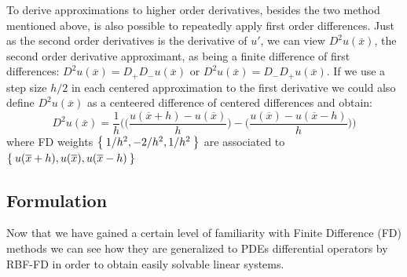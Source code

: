 To derive approximations to higher order derivatives, besides the two method mentioned above, is also possible to repeatedly apply first order differences. Just as the second order derivatives is the derivative of $u'$, we can view $D^2u(\overline{x})$, the second order derivative approximant, as being a finite difference of first differences: $D^2 u(\overline{x}) = D_+ D_- u(\overline{x})$ or $D^2 u(\overline{x}) = D_- D_+ u(\overline{x})$. If we use a step size $h/2$ in each centered approximation to the first derivative we could also define $D^2 u(\overline{x})$ as a centeered difference of centered differences and obtain:
\begin{equation}
	D^2 u(\overline{x}) = \frac{1}{h} \Biggl( \biggl( \frac{u(\overline{x}+h) - u(\overline{x})}{h} \biggr) - \biggl( \frac{u(\overline{x}) - u(\overline{x}-h)}{h} \biggr) \Biggr)
\end{equation}
where FD weights $\Set{1/h^2, -2/h^2, 1/h^2}$ are associated to $\Set{u(\overline{x}+h), u(\overline{x}), u(\overline{x}-h)}$



\subsection{Formulation}

Now that we have gained a certain level of familiarity with Finite Difference  (FD) methods we can see how they are generalized to PDEs differential operators by RBF-FD in order to obtain easily solvable linear systems.

